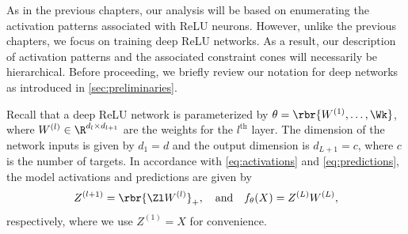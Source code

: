 
As in the previous chapters, our analysis will be based on enumerating
the activation patterns associated with ReLU neurons.
However, unlike the previous chapters, we focus on training deep ReLU networks.
As a result, our description of activation patterns and the associated
constraint cones will necessarily be hierarchical.
Before proceeding, we briefly review our notation for deep networks as
introduced in \cref{sec:preliminaries}.

Recall that a deep ReLU network is
parameterized by \( \theta = \rbr{W^{(1)}, \ldots, \Wk} \), where
\( W^{(l)} \in \R^{d_{l} \times d_{l+1}} \) are the weights for the
\( l^{\text{th}} \) layer.
The dimension of the network inputs is given by \( d_1 = d \) and the output
dimension is \( d_{L+1} = c \), where \( c \) is the number of targets.
In accordance with \cref{eq:activations} and \cref{eq:predictions}, the model
activations and predictions are given by
\[
    Z^{(l+1)} = \rbr{\Zl W^{(l)}}_+,
    \quad \text{and} \quad
    f_\theta(X) = Z^{(L)} W^{(L)},
\]
respectively, where we use \( Z^{(1)} = X \) for convenience.

